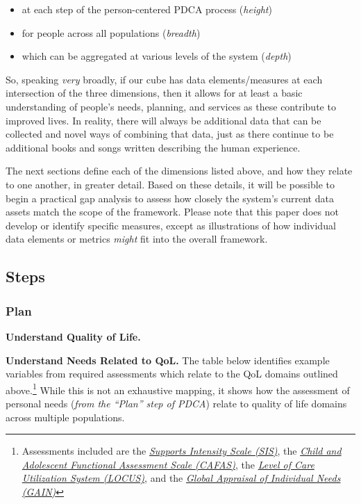 \documentclass[
]{book}
\providecommand{\tightlist}{%
  \setlength{\itemsep}{0pt}\setlength{\parskip}{0pt}}
\begin{document}
\begin{itemize}
\tightlist
\item
  at each step of the person-centered PDCA process (\emph{height})
\item
  for people across all populations (\emph{breadth})
\item
  which can be aggregated at various levels of the system (\emph{depth})
\end{itemize}

So, speaking \emph{very} broadly, if our cube has data elements/measures at each intersection of the three dimensions, then it allows for at least a basic understanding of people's needs, planning, and services as these contribute to improved lives. In reality, there will always be additional data that can be collected and novel ways of combining that data, just as there continue to be additional books and songs written describing the human experience.

The next sections define each of the dimensions listed above, and how they relate to one another, in greater detail. Based on these details, it will be possible to begin a practical gap analysis to assess how closely the system's current data assets match the scope of the framework. Please note that this paper does not develop or identify specific measures, except as illustrations of how individual data elements or metrics \emph{might} fit into the overall framework.

\hypertarget{steps}{%
\subsection{Steps}\label{steps}}

\hypertarget{plan}{%
\subsubsection{Plan}\label{plan}}

\textbf{Understand Quality of Life.}

\textbf{Understand Needs Related to QoL.} The table below identifies example variables from required assessments which relate to the QoL domains outlined above.\footnote{Assessments included are the \href{http://aaidd.org/sis}{\emph{Supports Intensity Scale (SIS)}}, the \href{http://www2.fasoutcomes.com/Content.aspx?ContentID=12}{\emph{Child and Adolescent Functional Assessment Scale (CAFAS)}}, the \href{https://cchealth.org/mentalhealth/pdf/LOCUS.pdf}{\emph{Level of Care Utilization System (LOCUS)}}, and the \href{http://gaincc.org/}{\emph{Global Appraisal of Individual Needs (GAIN)}}} While this is not an exhaustive mapping, it shows how the assessment of personal needs (\emph{from the ``Plan'' step of PDCA}) relate to quality of life domains across multiple populations.
\end{document}
